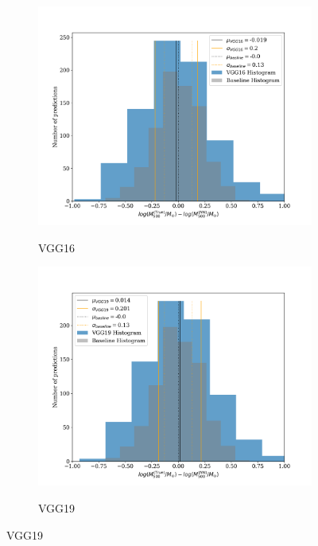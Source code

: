 \begin{figure}[H]
\centering
\begin{subfigure}{.325\textwidth}
    \centering
    \includegraphics[width=\linewidth]{images/Chapter4/Results/test_VGG16_hist.png}
    \label{fig:test_VGG16_hist}
    \caption{VGG16}
\end{subfigure}
\begin{subfigure}{.325\textwidth}
    \centering
    \includegraphics[width=\linewidth]{images/Chapter4/Results/test_VGG19_hist.png}
    \label{fig:test_VGG19_hist}
    \caption{VGG19}
\end{subfigure}

\end{figure}
